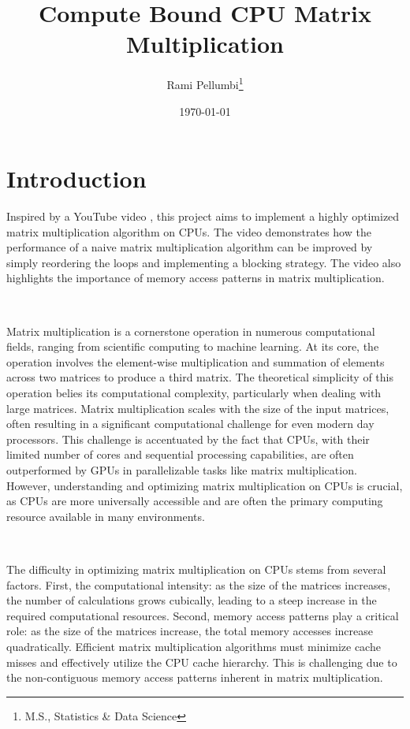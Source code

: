 \documentclass{article}
\title{Compute Bound CPU Matrix Multiplication}
\author{Rami Pellumbi\thanks{M.S., Statistics \& Data Science}}
\date{\today}
\newcommand{\MYhref}[3][blue]{\href{#2}{\color{#1}{#3}}}%
\begin{document}
\maketitle

\newpage 

\section{Introduction}
Inspired by a YouTube video \MYhref{https://www.youtube.com/watch?v=QGYvbsHDPxo}{`Adding Nested 
Loops Makes this Algorithm 120x FASTER'}, this project aims to implement a highly optimized
matrix multiplication algorithm on CPUs. The video demonstrates how the performance of a
naive matrix multiplication algorithm can be improved by simply reordering the loops and 
implementing a blocking strategy. The video also highlights the importance of memory access
patterns in matrix multiplication.

\

\noindent Matrix multiplication is a cornerstone operation in numerous computational fields,
ranging from scientific computing to machine learning. At its core, the operation 
involves the element-wise multiplication and summation of elements across two matrices 
to produce a third matrix. The theoretical simplicity of this operation belies its 
computational complexity, particularly when dealing with large matrices. 
Matrix multiplication scales with the size of the input matrices, often resulting 
in a significant computational challenge for even modern day processors. 
This challenge is accentuated by the fact that CPUs, with their limited number 
of cores and sequential processing capabilities, are often outperformed by GPUs in 
parallelizable tasks like matrix multiplication. However, understanding and optimizing 
matrix multiplication on CPUs is crucial, as CPUs are more universally accessible 
and are often the primary computing resource available in many environments.

\ 

\noindent The difficulty in optimizing matrix multiplication on CPUs stems from several factors. 
First, the computational intensity: as the size of the matrices increases, 
the number of calculations grows cubically, leading to a steep increase in the 
required computational resources. Second, memory access patterns play a critical role: as the 
size of the matrices increase, the total memory accesses increase quadratically.
Efficient matrix multiplication algorithms must minimize cache misses and effectively utilize 
the CPU cache hierarchy. This is challenging due to the non-contiguous memory access 
patterns inherent in matrix multiplication. 
\end{document}
